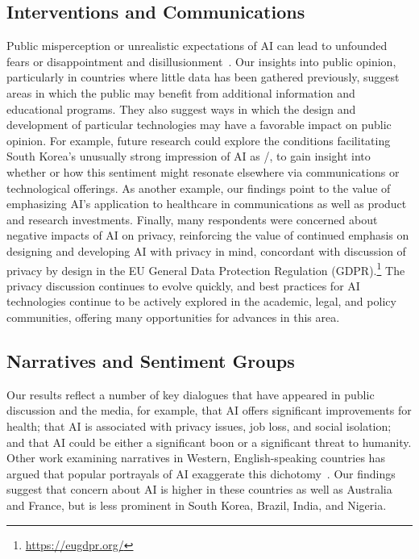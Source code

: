 \documentclass[sigconf]{acmart}
\begin{document}
\subsection{Interventions and Communications}
Public misperception or unrealistic expectations of AI can lead to unfounded fears or disappointment and disillusionment~\cite{blumberg2019, cave2018portrayals}. 
Our insights into public opinion, particularly in countries where little data has been gathered previously, suggest areas in which the public may benefit from additional information and educational programs.
They also suggest ways in which the design and development of particular technologies may have a favorable impact on public opinion.
For example, future research could explore the conditions facilitating South Korea's unusually strong impression of AI as \Useful/, to gain insight into whether or how this sentiment might resonate elsewhere via communications or technological offerings.
As another example, our findings point to the value of emphasizing AI's application to healthcare in communications as well as product and research investments.
Finally, many respondents were concerned about negative impacts of AI on privacy, reinforcing the value of continued emphasis on designing and developing AI with privacy in mind, concordant with discussion of privacy by design in the EU General Data Protection Regulation (GDPR).\footnote{\url{https://eugdpr.org/}} The privacy discussion continues to evolve quickly, and best practices for AI technologies continue to be actively explored in the academic, legal, and policy communities, offering many opportunities for advances in this area.

\subsection{Narratives and Sentiment Groups}
Our results reflect a number of key dialogues that have appeared in public discussion and the media, for example, that AI offers significant improvements for health; that AI is associated with privacy issues, job loss, and social isolation; and that AI could be either a significant boon or a significant threat to humanity. Other work examining narratives in Western, English-speaking countries has argued that popular portrayals of AI exaggerate this dichotomy~\cite{cave2018portrayals}. Our findings suggest that concern about AI is higher in these countries as well as Australia and France, but is less prominent in South Korea, Brazil, India, and Nigeria.
\end{document}
